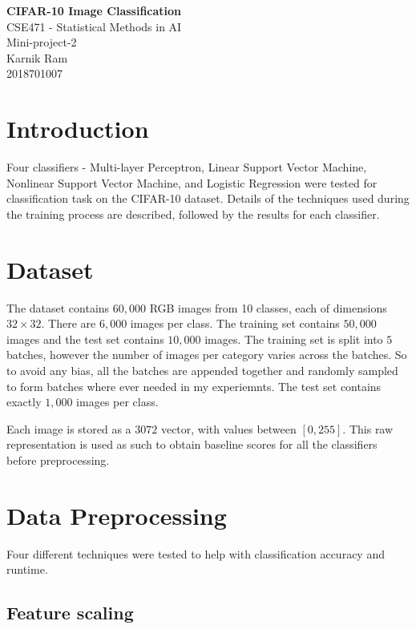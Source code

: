 \documentclass[12pt]{article}
\begin{document}
 \begin{center}
  \huge{\textbf{CIFAR-10 Image Classification}\\}
  \Large{CSE471 - Statistical Methods in AI}\\
  Mini-project-2\\
  \vspace{0.2in}
  Karnik Ram\\
  2018701007
 \end{center}
 
\section*{Introduction}

Four classifiers - Multi-layer Perceptron, Linear Support Vector Machine, Nonlinear Support Vector Machine, and Logistic Regression were tested for classification task on the CIFAR-10 dataset. Details of the techniques used during the training process are described, followed by the results for each classifier.

\section*{Dataset}

The dataset contains $60,000$ RGB images from 10 classes, each of dimensions $32 \times 32$. There are $6,000$ images per class. The training set contains $50,000$ images and the test set contains $10,000$ images. The training set is split into $5$ batches, however the number of images per category varies across the batches. So to avoid any bias, all the batches are appended together and randomly sampled to form batches where ever needed in my experiemnts. The test set contains exactly $1,000$ images per class.

Each image is stored as a $3072$ vector, with values between $[0,255]$. This raw representation is used as such to obtain baseline scores for all the classifiers before preprocessing.

\section*{Data Preprocessing}

Four different techniques were tested to help with classification accuracy and runtime.

\subsection*{Feature scaling}
\end{document}
